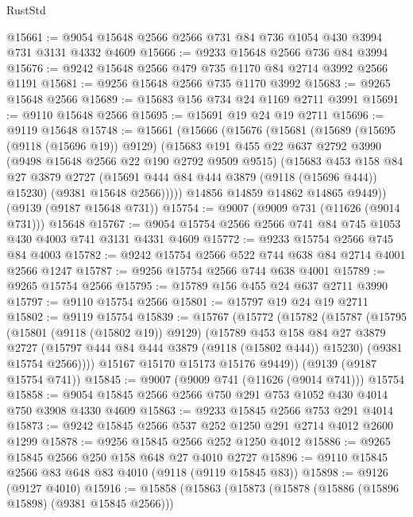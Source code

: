 \begin{lexlean}{RustStd}
\begin{coremodule}
@15661 := @9054 @15648 @2566 @2566 @731 @84 @736 @1054 @430 @3994 @731 @3131 @4332 @4609
@15666 := @9233 @15648 @2566 @736 @84 @3994
@15676 := @9242 @15648 @2566 @479 @735 @1170 @84 @2714 @3992 @2566 @1191
@15681 := @9256 @15648 @2566 @735 @1170 @3992
@15683 := @9265 @15648 @2566
@15689 := @15683 @156 @734 @24 @1169 @2711 @3991
@15691 := @9110 @15648 @2566
@15695 := @15691 @19 @24 @19 @2711
@15696 := @9119 @15648
@15748 := @15661
    (@15666
      (@15676
        (@15681
          (@15689
            (@15695 (@9118 (@15696 @19)) @9129)
            (@15683
              @191
              @455
              @22
              @637
              @2792
              @3990
              (@9498 @15648 @2566 @22 @190 @2792 @9509 @9515)
              (@15683
                @453
                @158
                @84
                @27
                @3879
                @2727
                (@15691 @444 @84 @444 @3879 (@9118 (@15696 @444)) @15230)
                (@9381 @15648 @2566)))))
        @14856
        @14859
        @14862
        @14865
        @9449))
    (@9139 (@9187 @15648 @731))
@15754 := @9007 (@9009 @731 (@11626 (@9014 @731))) @15648
@15767 := @9054 @15754 @2566 @2566 @741 @84 @745 @1053 @430 @4003 @741 @3131 @4331 @4609
@15772 := @9233 @15754 @2566 @745 @84 @4003
@15782 := @9242 @15754 @2566 @522 @744 @638 @84 @2714 @4001 @2566 @1247
@15787 := @9256 @15754 @2566 @744 @638 @4001
@15789 := @9265 @15754 @2566
@15795 := @15789 @156 @455 @24 @637 @2711 @3990
@15797 := @9110 @15754 @2566
@15801 := @15797 @19 @24 @19 @2711
@15802 := @9119 @15754
@15839 := @15767
    (@15772
      (@15782
        (@15787
          (@15795
            (@15801 (@9118 (@15802 @19)) @9129)
            (@15789
              @453
              @158
              @84
              @27
              @3879
              @2727
              (@15797 @444 @84 @444 @3879 (@9118 (@15802 @444)) @15230)
              (@9381 @15754 @2566))))
        @15167
        @15170
        @15173
        @15176
        @9449))
    (@9139 (@9187 @15754 @741))
@15845 := @9007 (@9009 @741 (@11626 (@9014 @741))) @15754
@15858 := @9054 @15845 @2566 @2566 @750 @291 @753 @1052 @430 @4014 @750 @3908 @4330 @4609
@15863 := @9233 @15845 @2566 @753 @291 @4014
@15873 := @9242 @15845 @2566 @537 @252 @1250 @291 @2714 @4012 @2600 @1299
@15878 := @9256 @15845 @2566 @252 @1250 @4012
@15886 := @9265 @15845 @2566 @250 @158 @648 @27 @4010 @2727
@15896 := @9110 @15845 @2566 @83 @648 @83 @4010 (@9118 (@9119 @15845 @83))
@15898 := @9126 (@9127 @4010)
@15916 := @15858
    (@15863
      (@15873
        (@15878 (@15886 (@15896 @15898) (@9381 @15845 @2566)))

\end{coremodule}
\end{lexlean}

